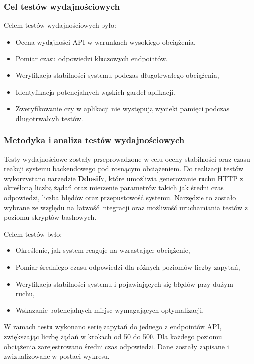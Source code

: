 \subsubsection{Cel testów wydajnościowych}
Celem testów wydajnościowych było:
\begin{itemize}
    \item Ocena wydajności API w warunkach wysokiego obciążenia,
    \item Pomiar czasu odpowiedzi kluczowych endpointów,
    \item Weryfikacja stabilności systemu podczas długotrwałego obciążenia,
    \item Identyfikacja potencjalnych wąskich gardeł aplikacji.
    \item Zweryfikowanie czy w aplikacji nie występują wycieki pamięci podczas długotrwałcyh testów.
\end{itemize}

\subsubsection{Metodyka i analiza testów wydajnościowych}

Testy wydajnościowe zostały przeprowadzone w celu oceny stabilności oraz czasu reakcji systemu backendowego pod rosnącym obciążeniem. Do realizacji testów wykorzystano narzędzie \textbf{Ddosify}, które umożliwia generowanie ruchu HTTP z określoną liczbą żądań oraz mierzenie parametrów takich jak średni czas odpowiedzi, liczba błędów oraz przepustowość systemu. Narzędzie to zostało wybrane ze względu na łatwość integracji oraz możliwość uruchamiania testów z poziomu skryptów bashowych.

Celem testów było:
\begin{itemize}
    \item Określenie, jak system reaguje na wzrastające obciążenie,
    \item Pomiar średniego czasu odpowiedzi dla różnych poziomów liczby zapytań,
    \item Weryfikacja stabilności systemu i pojawiających się błędów przy dużym ruchu,
    \item Wskazanie potencjalnych miejsc wymagających optymalizacji.
\end{itemize}

W ramach testu wykonano serię zapytań do jednego z endpointów API, zwiększając liczbę żądań w krokach od 50 do 500. Dla każdego poziomu obciążenia zarejestrowano średni czas odpowiedzi. Dane zostały zapisane i zwizualizowane w postaci wykresu.

